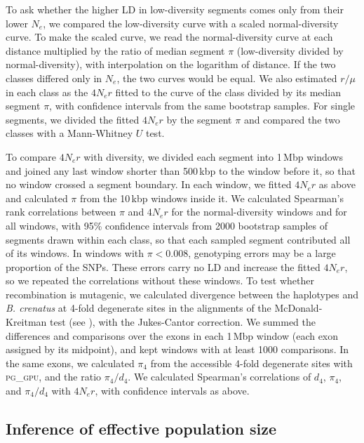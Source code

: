 To ask whether the higher LD in low-diversity segments comes only from their lower
$N_{e}$, we compared the low-diversity curve with a scaled normal-diversity curve.
To make the scaled curve, we read the normal-diversity curve at each distance multiplied
by the ratio of median segment $\pi$ (low-diversity divided by normal-diversity), with
interpolation on the logarithm of distance.
If the two classes differed only in $N_{e}$, the two curves would be equal.
We also estimated $r/\mu$ in each class as the $4N_{e}r$ fitted to the curve of the
class divided by its median segment $\pi$, with confidence intervals from the same
bootstrap samples.
For single segments, we divided the fitted $4N_{e}r$ by the segment $\pi$ and compared
the two classes with a Mann-Whitney $U$ test.
\vspace{0.1cm}

To compare $4N_{e}r$ with diversity, we divided each segment into 1\,Mbp windows
and joined any last window shorter than 500\,kbp to the window before it, so
that no window crossed a segment boundary.
In each window, we fitted $4N_{e}r$ as above and calculated $\pi$ from the 10\,kbp
windows inside it.
We calculated Spearman's rank correlations between $\pi$ and $4N_{e}r$ for the
normal-diversity windows and for all windows, with 95\% confidence intervals from \num{2000}
bootstrap samples of segments drawn within each class, so that each sampled segment
contributed all of its windows.
In windows with $\pi < 0.008$, genotyping errors may be a large proportion of the SNPs.
These errors carry no LD and increase the fitted $4N_{e}r$, so we repeated the
correlations without these windows.
To test whether recombination is mutagenic, we calculated divergence between the
\bgla{} haplotypes and \textit{B. crenatus} at 4-fold degenerate sites in the
alignments of the McDonald-Kreitman test (see ), with the
Jukes-Cantor correction.
We summed the differences and comparisons over the exons in each 1\,Mbp window (each exon
assigned by its midpoint), and kept windows with at least \num{1000} comparisons.
In the same exons, we calculated $\pi_{4}$ from the accessible 4-fold degenerate sites
with \textsc{pg\_gpu}, and the ratio $\pi_{4}/d_{4}$.
We calculated Spearman's correlations of $d_{4}$, $\pi_{4}$, and $\pi_{4}/d_{4}$ with
$4N_{e}r$, with confidence intervals as above.

\subsection*{Inference of effective population size}

